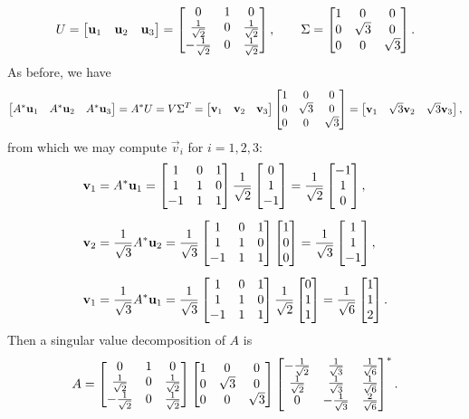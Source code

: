 \documentclass{homework}
\begin{document}
\begin{alphaparts}
		\begin{equation*}
			U = \left[\begin{matrix}\mathbf{u}_1 &\mathbf{u}_2 & \mathbf{u}_3\end{matrix}\right] = \left[\begin{matrix}0 & 1 & 0 \\ \frac{1}{\sqrt{2}} & 0 & \frac{1}{\sqrt{2}} \\ -\frac{1}{\sqrt{2}} & 0 & \frac{1}{\sqrt{2}}\end{matrix}\right], \qquad \Sigma = \left[\begin{matrix}1 & 0 & 0 \\ 0& \sqrt{3} & 0 \\ 0 & 0 & \sqrt{3}\end{matrix}\right].
		\end{equation*}
		As before, we have
		\begin{equation*}
			\left[\begin{matrix}A^*\mathbf{u}_1 & A^*\mathbf{u}_2 & A^*\mathbf{u}_3\end{matrix}\right] = A^*U = V\Sigma^T = \left[\begin{matrix}\mathbf{v}_1 & \mathbf{v}_2 & \mathbf{v}_3\end{matrix}\right]\left[\begin{matrix}1 & 0 & 0 \\ 0 & \sqrt{3} & 0 \\ 0 & 0 &\sqrt{3}\end{matrix}\right] = \left[\begin{matrix}\mathbf{v}_1 & \sqrt{3}\mathbf{v}_2 & \sqrt{3}\mathbf{v}_3\end{matrix}\right],
		\end{equation*}
		from which we may compute $\vec{v}_i$ for $i=1,2,3$:
		\begin{equation*}
			\begin{aligned}
			\mathbf{v}_1 &= A^*\mathbf{u}_1 = \left[\begin{matrix}1 & 0 &1 \\ 1&1&0\\-1&1&1\end{matrix}\right]\frac{1}{\sqrt{2}}\left[\begin{matrix}0\\1\\-1\end{matrix}\right] = \frac{1}{\sqrt{2}}\left[\begin{matrix}-1\\1\\0\end{matrix}\right], \\[0.5em]
			\mathbf{v}_2 &= \frac{1}{\sqrt{3}}A^*\mathbf{u}_2 = \frac{1}{\sqrt{3}}\left[\begin{matrix}1 & 0 &1 \\ 1&1&0\\-1&1&1\end{matrix}\right]\left[\begin{matrix}1\\0\\0\end{matrix}\right] = \frac{1}{\sqrt{3}}\left[\begin{matrix}1\\1\\-1\end{matrix}\right], \\[0.5em]
			\mathbf{v}_1 &= \frac{1}{\sqrt{3}}A^*\mathbf{u}_1 = \frac{1}{\sqrt{3}}\left[\begin{matrix}1 & 0 &1 \\ 1&1&0\\-1&1&1\end{matrix}\right]\frac{1}{\sqrt{2}}\left[\begin{matrix}0\\1\\1\end{matrix}\right] = \frac{1}{\sqrt{6}}\left[\begin{matrix}1\\1\\2\end{matrix}\right]. \\
			\end{aligned}
		\end{equation*}
		Then a singular value decomposition of $A$ is
		\begin{equation*}
			A = \left[\begin{matrix}0 & 1 & 0 \\ \frac{1}{\sqrt{2}} & 0 & \frac{1}{\sqrt{2}} \\ -\frac{1}{\sqrt{2}} & 0 & \frac{1}{\sqrt{2}}\end{matrix}\right]\left[\begin{matrix}1 & 0 & 0 \\ 0& \sqrt{3} & 0 \\ 0 & 0 & \sqrt{3}\end{matrix}\right]\left[\begin{matrix}-\frac{1}{\sqrt{2}} & \frac{1}{\sqrt{3}} & \frac{1}{\sqrt{6}} \\ \frac{1}{\sqrt{2}} & \frac{1}{\sqrt{3}} & \frac{1}{\sqrt{6}} \\ 0 &  -\frac{1}{\sqrt{3}} & \frac{2}{\sqrt{6}}\end{matrix}\right]^*.
		\end{equation*}
	\end{alphaparts}
\end{document}
